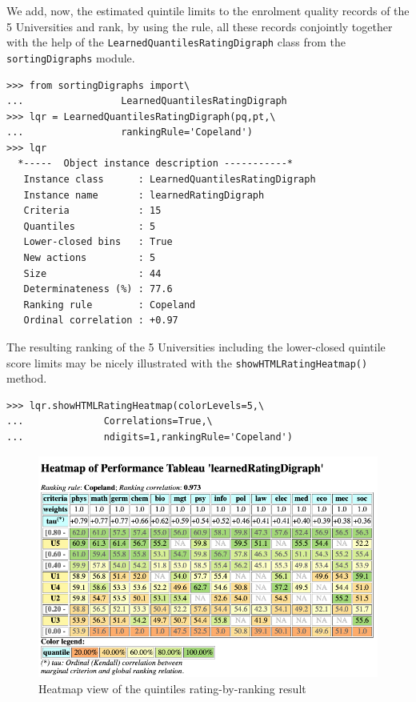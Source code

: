 We add, now, the estimated quintile limits to the enrolment quality records of the 5 Universities and rank, by using the \Copeland rule, all these records conjointly together with the help of the \texttt{LearnedQuantilesRatingDigraph} class from the \texttt{sortingDigraphs} module.
\begin{lstlisting}
>>> from sortingDigraphs import\
...                 LearnedQuantilesRatingDigraph
>>> lqr = LearnedQuantilesRatingDigraph(pq,pt,\
...                 rankingRule='Copeland')
>>> lqr
  *-----  Object instance description -----------*
   Instance class      : LearnedQuantilesRatingDigraph
   Instance name       : learnedRatingDigraph
   Criteria            : 15
   Quantiles           : 5
   Lower-closed bins   : True
   New actions         : 5
   Size                : 44
   Determinateness (%) : 77.6
   Ranking rule        : Copeland
   Ordinal correlation : +0.97
\end{lstlisting}

The resulting ranking of the 5 Universities including the lower-closed quintile score limits may be nicely illustrated  with the \texttt{showHTMLRatingHeatmap()} method.
\begin{lstlisting}
>>> lqr.showHTMLRatingHeatmap(colorLevels=5,\
...              Correlations=True,\
...              ndigits=1,rankingRule='Copeland')
\end{lstlisting}
\begin{figure}[ht]
\includegraphics[width=\hsize]{Figures/14-3-quintilingResult.png}
\caption{Heatmap view of the quintiles rating-by-ranking result}
\label{fig:14.3}       %
\end{figure}


